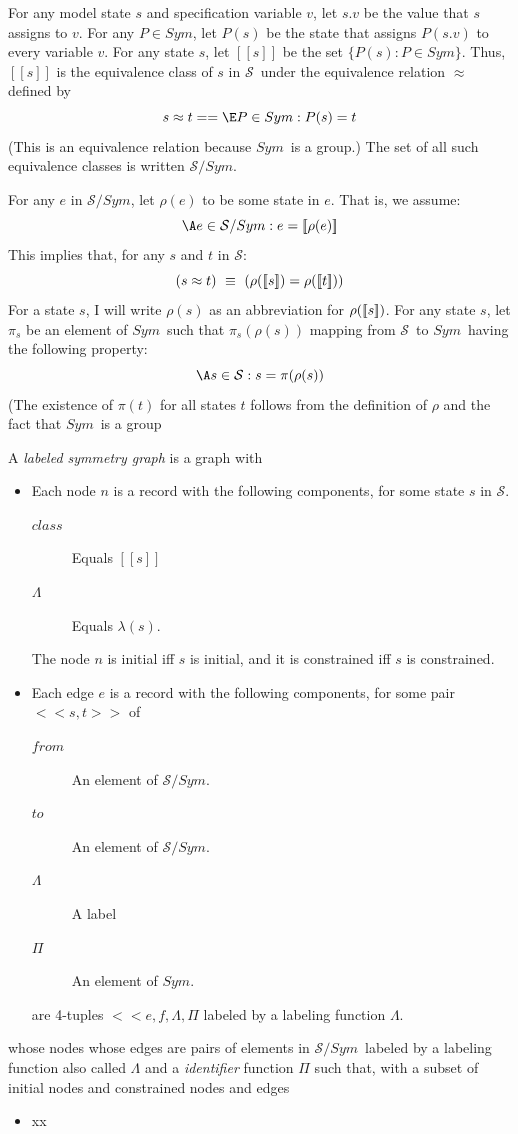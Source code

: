 \documentclass[fleqn,leqno]{article}
\newcommand{\sym}{\ensuremath{Sym}}
\newcommand{\ec}[1]{\mbox{\ensuremath{[\![#1]\!]}}}
\newcommand{\states}{\ensuremath{\mathcal{S}}}
\newcommand{\smod}{\ensuremath{\states/\sym}}
\newcommand{\rep}[1]{\ensuremath{\rho(#1)}}
\newcommand{\cng}{\approx}
\begin{document}
For any model state $s$ and specification variable $v$, let $s.v$ be
the value that $s$ assigns to $v$.  For any $P\in\sym$, let $P(s)$ be
the state that assigns $P(s.v)$ to every variable $v$.  For any state
$s$, let \ec{s} be the set $\{P(s):P\in\sym\}$.  Thus, \ec{s} is the
equivalence class of $s$ in \states\ under the equivalence relation
$\cng$ defined by
  \[ s \cng t == \E P \in \sym : P(s)= t\]
(This is an equivalence relation because \sym\ is a group.)  The set
of all such equivalence classes is written \smod.

For any $e$ in \smod, let \rep{e} to be some state in $e$.  That is,
we assume:
  \[ \A e \in \smod : e = \ec{\rep{e}}
  \]
This implies that, for any $s$ and $t$ in \states:
  \[ (s\cng t) \ \equiv\ (\rep{\ec{s}} = \rep{\ec{t}})
  \]
For a state $s$, I will write \rep{s} as an abbreviation for
\rep{\ec{s}}.  For any state $s$, let $\pi_{s}$ be an element
of \sym\ such that $\pi_{s}(\rho(s))$
mapping from \states\ to \sym\ having
the following property:
  \[ \A s \in \states : s = \pi(\rho(s))
  \]
(The existence of $\pi(t)$ for all states $t$ follows from the
definition of $\rho$ and the fact that \sym\ is a group

A \emph{labeled symmetry graph} is a graph with
\begin{itemize}
\item Each node $n$ is a record with the following components,
for some state $s$ in \states.
\begin{description}
\item[$class$] Equals \ec{s}

\item [$\Lambda$] Equals $\lambda(s)$.
\end{description}
The node $n$ is initial iff $s$ is initial, and it is constrained iff
$s$ is constrained.

\item Each edge $e$ is a record with the following components, 
for some pair $<<s, t>>$ of 
\begin{description}
\item[$from$] An element of \smod.

\item[$to$] An element of \smod.

\item [$\Lambda$] A label

\item[$\Pi$] An element of \sym.
\end{description}



are 4-tuples $<<e, f, \Lambda, \Pi$
labeled by a labeling function $\Lambda$.
\end{itemize}
whose nodes 
whose edges are pairs of elements in \smod\ labeled by
a labeling function also called $\Lambda$ and a \emph{identifier}
function $\Pi$ such that, with a subset of initial nodes
and constrained nodes and edges
\begin{itemize}
\item[] xx
\end{itemize}
\end{document}
